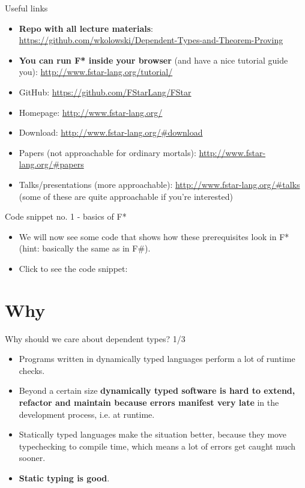 \documentclass{beamer}
\begin{document}
\begin{frame}{Useful links}
\begin{itemize}
	\item \textbf{Repo with all lecture materials}: \url{https://github.com/wkolowski/Dependent-Types-and-Theorem-Proving}
	\item \textbf{You can run F* inside your browser} (and have a nice tutorial guide you): \url{http://www.fstar-lang.org/tutorial/}
	\item GitHub: \url{https://github.com/FStarLang/FStar}
	\item Homepage: \url{http://www.fstar-lang.org/}
	\item Download: \url{http://www.fstar-lang.org/\#download}
	\item Papers (not approachable for ordinary mortals): \url{http://www.fstar-lang.org/\#papers}
	\item Talks/presentations (more approachable): \url{http://www.fstar-lang.org/\#talks} (some of these are quite approachable if you're interested)  
\end{itemize}
\end{frame}

\begin{frame}{Code snippet no. 1 - basics of F*}
\begin{itemize}
	\item We will now see some code that shows how these prerequisites look in F* (hint: basically the same as in F\#).
	\item Click to see the code snippet: \href{https://github.com/wkolowski/Dependent-Types-and-Theorem-Proving/blob/master/Code/Prerequisites.fst}{\color{blue}{Code/Prerequisites.fst}}
\end{itemize}
\end{frame}

\section{Why}

\begin{frame}{Why should we care about dependent types? 1/3}
\begin{itemize}
	\item Programs written in dynamically typed languages perform a lot of runtime checks.
	\item Beyond a certain size \textbf{dynamically typed software is hard to extend, refactor and maintain because errors manifest very late} in the development process, i.e. at runtime.
	\item Statically typed languages make the situation better, because they move typechecking to compile time, which means a lot of errors get caught much sooner.
	\item \textbf{Static typing is good}.
\end{itemize}
\end{frame}
\end{document}
